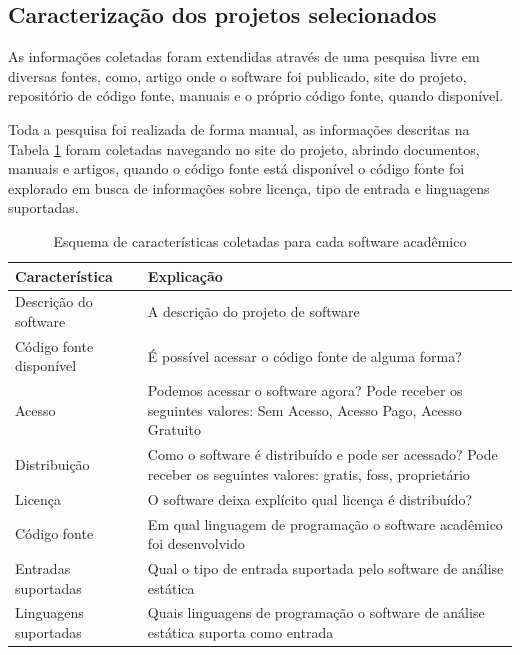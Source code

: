 \subsection{Caracterização dos projetos selecionados}

As informações coletadas foram extendidas através de uma pesquisa livre em
diversas fontes, como, artigo onde o software foi publicado, site do projeto,
repositório de código fonte, manuais e o próprio código fonte, quando
disponível.

Toda a pesquisa foi realizada de forma manual, as informações descritas na
Tabela \ref{coding-scheme-software} foram coletadas navegando no site do
projeto, abrindo documentos, manuais e artigos, quando o código fonte está
disponível o código fonte foi explorado em busca de informações sobre licença,
tipo de entrada e linguagens suportadas.

\begin{table}[h]
\caption{Esquema de características coletadas para cada software acadêmico}
\centering
\begin{tabular}{ l p{11cm} }
  \hline
  Característica           & Explicação \\
  \hline
  Descrição do software    & A descrição do projeto de software \\
  Código fonte disponível  & É possível acessar o código fonte de alguma forma? \\
  Acesso                   & Podemos acessar o software agora? Pode receber os seguintes valores: Sem Acesso, Acesso Pago, Acesso Gratuito \\
  Distribuição             & Como o software é distribuído e pode ser acessado? Pode receber os seguintes valores: gratis, foss, proprietário \\
  Licença                  & O software deixa explícito qual licença é distribuído? \\
  Código fonte             & Em qual linguagem de programação o software acadêmico foi desenvolvido \\
  Entradas suportadas      & Qual o tipo de entrada suportada pelo software de análise estática \\
  Linguagens suportadas    & Quais linguagens de programação o software de análise estática suporta como entrada \\
  \hline
\end{tabular}
\label{coding-scheme-software}
\end{table}

